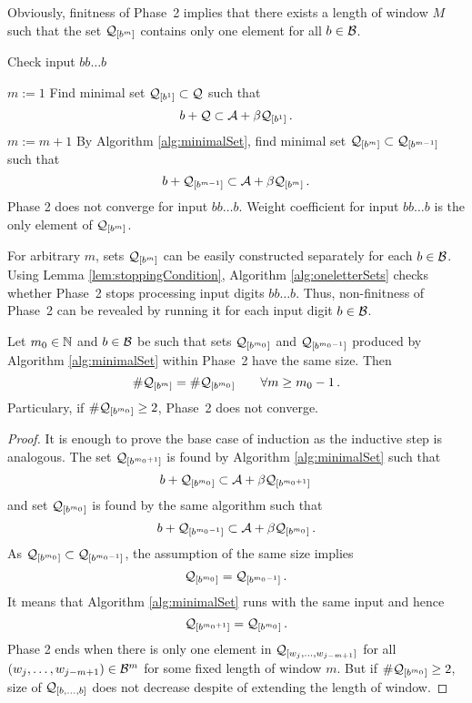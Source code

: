 Obviously, finitness of Phase~2 implies that there exists a length of window $M$ such that the set $\mathcal{Q}_{[b^{m}]}$ contains only one element for all $b\in\mathcal{B}$. 

\begin{algorithm}
  \caption{Check input $bb\dots b$}
    \label{alg:oneletterSets}
  \begin{algorithmic}[1]
    \STATE $m:=1$
    \STATE Find minimal set $\mathcal{Q}_{[b^{1}]} \subset \mathcal{Q}$ such that
      $$
      b + \mathcal{Q} \subset \mathcal{A} + \beta \mathcal{Q}_{[b^{1}]}\,.
      $$
      \vspace{-20pt}
        \STATE $m:= m +1$
        \STATE By Algorithm \ref{alg:minimalSet}, find minimal set $\mathcal{Q}_{[b^{m}]} \subset \mathcal{Q}_{[b^{m-1}]}$ such that
          $$
          b + \mathcal{Q}_{[b^{m-1}]} \subset \mathcal{A} + \beta \mathcal{Q}_{[b^{m}]}\,.
          $$  
          \vspace{-20pt}
            \RETURN Phase 2 does not converge for input $bb\dots b$.
        \ENDIF
    \ENDWHILE  
    \RETURN Weight coefficient for input $bb\dots b$ is the only element of $\mathcal{Q}_{[b^{m}]}$.
  \end{algorithmic}
\end{algorithm}

For arbitrary $m$, sets $\mathcal{Q}_{[b^{m}]}$  can be easily constructed separately for each $b\in\mathcal{B}$. Using Lemma \ref{lem:stoppingCondition}, Algorithm \ref{alg:oneletterSets} checks whether Phase~2 stops processing input digits $bb\dots b$. Thus,  non-finitness of Phase~2 can be revealed by running it for each input digit $b\in\mathcal{B}$.
\begin{lem}
\label{lem:stoppingCondition}
Let $m_0 \in \mathbb{N}$ and $b\in\mathcal{B}$ be such that sets $\mathcal{Q}_{[b^{m_0}]}$ and $\mathcal{Q}_{[b^{m_0-1}]}$ produced by Algorithm \ref{alg:minimalSet} within Phase~2 have the same size. Then
$$
    \#\mathcal{Q}_{[b^{m}]} = \#\mathcal{Q}_{[b^{m_0}]} \qquad \forall m\geq m_0-1\,.
$$ 
Particulary, if $\#\mathcal{Q}_{[b^{m_0}]}\geq 2$, Phase~2 does not converge.
\end{lem}
\begin{proof}
It is enough to prove the base case of induction as the inductive step is analogous. The set $\mathcal{Q}_{[b^{m_0+1}]}$ is found by Algorithm \ref{alg:minimalSet} such that 
$$
b + \mathcal{Q}_{[b^{m_0}]} \subset \mathcal{A} + \beta \mathcal{Q}_{[b^{m_0+1}]}\,
$$
and set $\mathcal{Q}_{[b^{m_0}]}$ is found by the same algorithm such that
$$
b + \mathcal{Q}_{[b^{m_0-1}]} \subset \mathcal{A} + \beta \mathcal{Q}_{[b^{m_0}]}\,.
$$
As $\mathcal{Q}_{[b^{m_0}]} \subset \mathcal{Q}_{[b^{m_0-1}]}$, the assumption of the same size implies
$$
    \mathcal{Q}_{[b^{m_0}]} = \mathcal{Q}_{[b^{m_0-1}]}\,.
$$
It means that Algorithm \ref{alg:minimalSet} runs with the same input and hence
$$
\mathcal{Q}_{[b^{m_0+1}]}=\mathcal{Q}_{[b^{m_0}]}\,.
$$
Phase 2 ends when there is only one element in $\mathcal{Q}_{[w_j,\dots, w_{j-m+1}]}$ for all $(w_j,\dots, w_{j-m+1}) \in \mathcal{B}^m$ for some fixed length of window $m$. But if $\#\mathcal{Q}_{[b^{m_0}]}\geq 2$, size of $\mathcal{Q}_{[b,\dots,b]}$ does not decrease despite of extending the length of window.
\end{proof}
